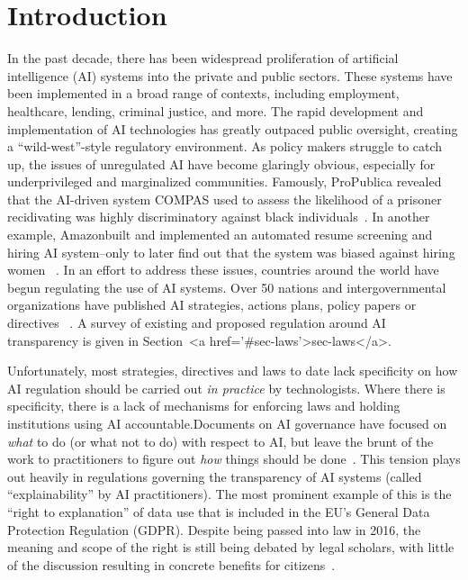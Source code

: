 \documentclass[sigconf, nonacm]{acmart}
\begin{document}
\section{Introduction}
\label{sec:intro}

In the past decade, there has been widespread proliferation of artificial intelligence (AI) systems into the private and public sectors. These systems have been implemented in a broad range of contexts, including employment, healthcare, lending, criminal justice, and more. The rapid development and implementation of AI technologies has greatly outpaced public oversight, creating a ``wild-west''-style regulatory environment. As policy makers struggle to catch up, the issues of unregulated AI have become glaringly obvious, especially for underprivileged and marginalized communities. Famously, ProPublica revealed that the AI-driven system COMPAS used to assess the likelihood of a prisoner recidivating was highly discriminatory against black individuals~\cite{angwin2016machine}. In another example, Amazonbuilt and implemented an automated resume screening and hiring AI system--only to later find out that the system was biased against hiring women ~\cite{DBLP:journals/corr/abs-1909-03567}. In an effort to address these issues, countries around the world have begun regulating the use of AI systems. Over 50 nations and intergovernmental organizations have published AI strategies, actions plans, policy papers or directives ~\cite{unicri}. A survey of existing and proposed regulation around AI transparency is given in Section~<a href='#sec-laws'>sec-laws</a>.

Unfortunately, most strategies, directives and laws to date lack specificity on how AI regulation should be carried out \emph{in practice} by technologists. Where there is specificity, there is a lack of mechanisms for enforcing laws and holding institutions using AI accountable.Documents on AI governance have focused on \emph{what} to do (or what not to do) with respect to AI, but leave the brunt of the work to practitioners to figure out \emph{how} things should be done~\cite{DBLP:journals/corr/abs-1906-11668}. This tension plays out heavily in regulations governing the transparency of AI systems (called ``explainability'' by AI practitioners). The most prominent example of this is the ``right to explanation'' of data use that is included in the EU’s General Data Protection Regulation (GDPR). Despite being passed into law in 2016, the meaning and scope of the right is still being debated by legal scholars, with little of the discussion resulting in concrete benefits for citizens~\cite{DBLP:conf/fat/SelbstP18}.
\end{document}
